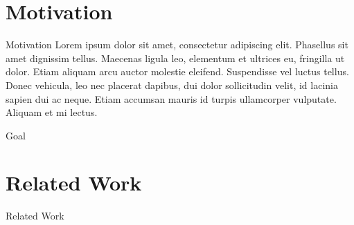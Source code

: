 \begin{frame}[t,plain]
\titlepage
\end{frame}

\section{Motivation}
\begin{frame}[t]{Motivation}
Lorem ipsum dolor sit amet, consectetur adipiscing elit. Phasellus sit amet dignissim tellus. Maecenas ligula leo, elementum et ultrices eu, fringilla ut dolor. Etiam aliquam arcu auctor molestie eleifend. Suspendisse vel luctus tellus. Donec vehicula, leo nec placerat dapibus, dui dolor sollicitudin velit, id lacinia sapien dui ac neque. Etiam accumsan mauris id turpis ullamcorper vulputate. Aliquam et mi lectus.
\end{frame}


\begin{frame}[t]{Goal}
  
\end{frame}

\section{Related Work}
\begin{frame}[t]{Related Work}
  
  
\end{frame}

